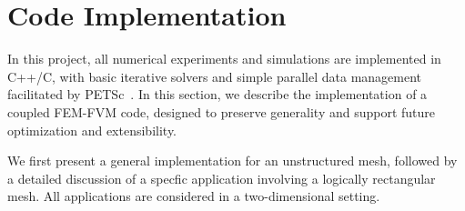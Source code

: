 
\chapter[Code Implementation]{Code Implementation}
\label{appex:code}

In this project, all numerical experiments and simulations are 
implemented in C++/C, with basic iterative solvers and 
simple parallel data management facilitated by PETSc~\cite{petsc-user-ref}.
In this section, we describe the implementation of a coupled FEM-FVM code,
designed to preserve generality and support future optimization and extensibility.

We first present a general implementation for an
unstructured mesh, followed by a detailed discussion of a specfic application
involving a logically rectangular mesh. All applications are considered in
a two-dimensional setting.



%
